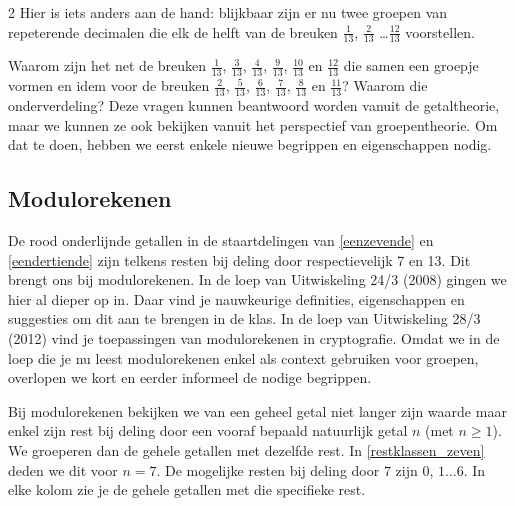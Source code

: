 \begin{multicols}{2}
	Hier is iets anders aan de hand: blijkbaar zijn er nu twee groepen van repeterende decimalen die elk de helft van de breuken $\frac{1}{13}$, $\frac{2}{13}$ \ldots $\frac{12}{13}$ voorstellen.
	
	Waarom zijn het net de breuken $\frac{1}{13}$, $\frac{3}{13}$, $\frac{4}{13}$, $\frac{9}{13}$, $\frac{10}{13}$ en $\frac{12}{13}$ die samen een groepje vormen en idem voor de breuken $\frac{2}{13}$, $\frac{5}{13}$, $\frac{6}{13}$, $\frac{7}{13}$, $\frac{8}{13}$ en $\frac{11}{13}$? Waarom die onderverdeling? Deze vragen kunnen beantwoord worden vanuit de getaltheorie, maar we kunnen ze ook bekijken vanuit het perspectief van groepentheorie. Om dat te doen, hebben we eerst enkele nieuwe begrippen en eigenschappen nodig.
	
	
	\subsection{Modulorekenen}
	
	De rood onderlijnde getallen in de staartdelingen van \autoref{eenzevende} en \autoref{eendertiende} zijn telkens resten bij deling door respectievelijk 7 en 13. Dit brengt ons bij modulorekenen. In de loep van Uitwiskeling 24/3 (2008) gingen we hier al dieper op in. Daar vind je nauwkeurige definities, eigenschappen en suggesties om dit aan te brengen in de klas. In de loep van Uitwiskeling 28/3 (2012) vind je toepassingen van modulorekenen in cryptografie.  Omdat we in de loep die je nu leest modulorekenen enkel als context gebruiken voor groepen, overlopen we kort en eerder informeel de nodige begrippen. 
	
	Bij modulorekenen bekijken we van een geheel getal niet langer zijn waarde maar enkel zijn rest bij deling door een vooraf bepaald natuurlijk getal $n$ (met $n\geq 1$). We groeperen dan de gehele getallen met dezelfde rest. In \autoref{restklassen_zeven} deden we dit voor $n=7$. De mogelijke resten bij deling door $7$ zijn $0$, $1 \ldots 6$. In elke kolom zie je de gehele getallen met die specifieke rest. 
	

\end{multicols}
